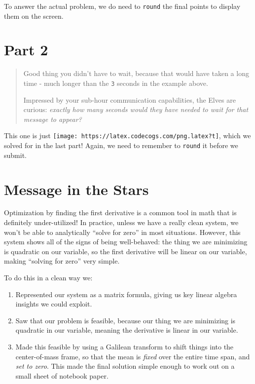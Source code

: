 \documentclass[]{article}
\begin{document}
To answer the actual problem, we do need to \texttt{round} the final points to
display them on the screen.

\hypertarget{part-2}{%
\section{Part 2}\label{part-2}}

\begin{quote}
Good thing you didn't have to wait, because that would have taken a long time -
much longer than the \texttt{3} seconds in the example above.

Impressed by your sub-hour communication capabilities, the Elves are curious:
\emph{exactly how many seconds would they have needed to wait for that message
to appear?}
\end{quote}

This one is just \texttt{[image: https://latex.codecogs.com/png.latex?t]}, which
we solved for in the last part! Again, we need to remember to \texttt{round} it
before we submit.

\hypertarget{message-in-the-stars}{%
\section{Message in the Stars}\label{message-in-the-stars}}

Optimization by finding the first derivative is a common tool in math that is
definitely under-utilized! In practice, unless we have a really clean system, we
won't be able to analytically ``solve for zero'' in most situations. However,
this system shows all of the signs of being well-behaved: the thing we are
minimizing is quadratic on our variable, so the first derivative will be linear
on our variable, making ``solving for zero'' very simple.

To do this in a clean way we:

\begin{enumerate}
\def\labelenumi{\arabic{enumi}.}
\tightlist
\item
  Represented our system as a matrix formula, giving us key linear algebra
  insights we could exploit.
\item
  Saw that our problem is feasible, because our thing we are minimizing is
  quadratic in our variable, meaning the derivative is linear in our variable.
\item
  Made this feasible by using a Galilean transform to shift things into the
  center-of-mass frame, so that the mean is \emph{fixed} over the entire time
  span, and \emph{set to zero}. This made the final solution simple enough to
  work out on a small sheet of notebook paper.
\end{enumerate}
\end{document}
